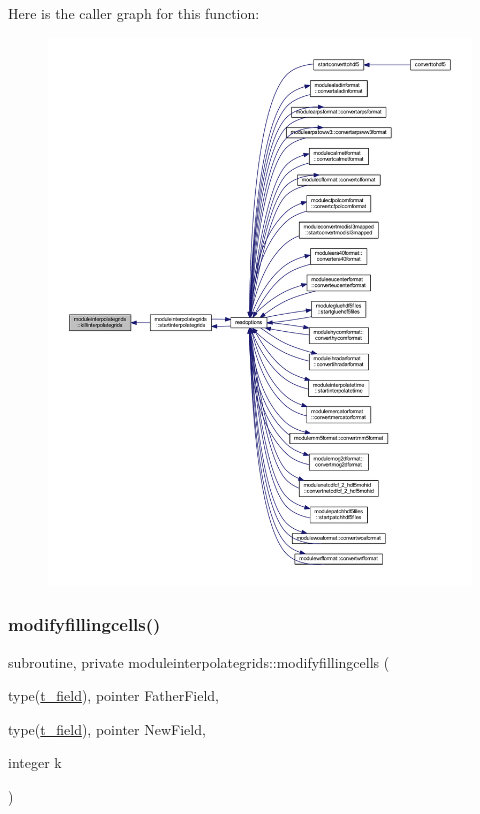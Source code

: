 Here is the caller graph for this function\+:\nopagebreak
\begin{figure}[H]
\begin{center}
\leavevmode
\includegraphics[width=350pt]{namespacemoduleinterpolategrids_a99be0febe139538023f622ad08cd5770_icgraph}
\end{center}
\end{figure}
\mbox{\label{namespacemoduleinterpolategrids_aef67e9e027ab07c151745060a6b0e649}} 
\subsubsection{\texorpdfstring{modifyfillingcells()}{modifyfillingcells()}}
{\footnotesize\ttfamily subroutine, private moduleinterpolategrids\+::modifyfillingcells (\begin{DoxyParamCaption}\item[{type(\mbox{\hyperlink{structmoduleinterpolategrids_1_1t__field}{t\+\_\+field}}), pointer}]{Father\+Field,  }\item[{type(\mbox{\hyperlink{structmoduleinterpolategrids_1_1t__field}{t\+\_\+field}}), pointer}]{New\+Field,  }\item[{integer}]{k }\end{DoxyParamCaption})\hspace{0.3cm}{\ttfamily [private]}}

